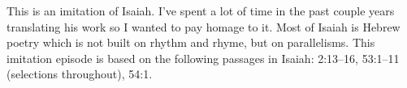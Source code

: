 This is an imitation of Isaiah. I've spent a lot of time in the past couple years translating his work so I wanted to pay homage to it. Most of Isaiah is Hebrew poetry which is not built on rhythm and rhyme, but on parallelisms. This imitation episode is based on the following passages in Isaiah: 2:13--16, 53:1--11 (selections throughout), 54:1.

